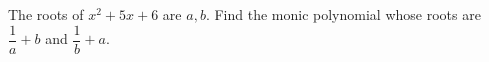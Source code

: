 The roots of $x^2+5x+6$ are $a,b$. Find the monic polynomial whose roots are $\dfrac{1}{a}+b$ and $\dfrac{1}{b}+a$.
